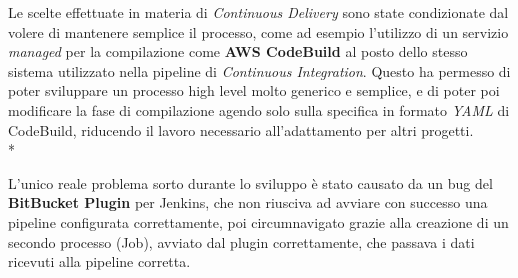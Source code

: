 \documentclass[../main.tex]{subfiles}
\begin{document}
            Le scelte effettuate in materia di \emph{Continuous Delivery} sono state condizionate dal volere di mantenere semplice il processo, come ad esempio l'utilizzo di un servizio \emph{managed} per la compilazione come \textbf{AWS CodeBuild} al posto dello stesso sistema utilizzato nella pipeline di \emph{Continuous Integration}. Questo ha permesso di poter sviluppare un processo high level molto generico e semplice, e di poter poi modificare la fase di compilazione agendo solo sulla specifica in formato \emph{YAML} di CodeBuild, riducendo il lavoro necessario all'adattamento per altri progetti.\\*
            
            L'unico reale problema sorto durante lo sviluppo è stato causato da un bug del \textbf{BitBucket Plugin} per Jenkins, che non riusciva ad avviare con successo una pipeline configurata correttamente, poi circumnavigato grazie alla creazione di un secondo processo (Job), avviato dal plugin correttamente, che passava i dati ricevuti alla pipeline corretta.
\end{document}
